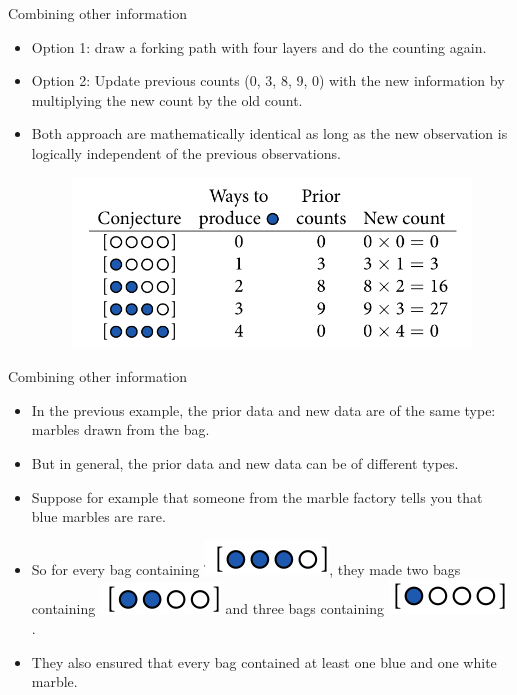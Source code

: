 \documentclass[handout]{beamer}
\begin{document}
\begin{frame}{Combining other information}
\scriptsize{
\begin{itemize}
 \item Option 1: draw a forking path with four layers and do the counting again.
\item Option 2: Update previous counts (0, 3, 8, 9, 0) with the new information by multiplying the new count by the old count.
\item Both approach are mathematically identical as long
as the new observation is logically independent of the previous observations. 

\begin{figure}[h!]
	\centering
	\includegraphics[scale=0.33]{pics/marbles16.png}
\end{figure}
\end{itemize}
 } 
\end{frame}



\begin{frame}{Combining other information}
\scriptsize{
\begin{itemize}
 \item In the previous example, the prior data and new data are of the same type: marbles drawn from the bag. 
 \item But in general, the prior data and new data can be of different types. 
 \item Suppose for example that someone from the marble factory tells you that blue marbles are rare.
 \item So for every bag containing \includegraphics[scale=0.3]{pics/marbles14.png}, they made two bags containing \includegraphics[scale=0.3]{pics/marbles13.png} and three bags containing \includegraphics[scale=0.3]{pics/marbles17.png} . 
 \item They also ensured that every bag contained at least one blue and one white marble. 
\end{itemize}
 } 
\end{frame}
\end{document}
